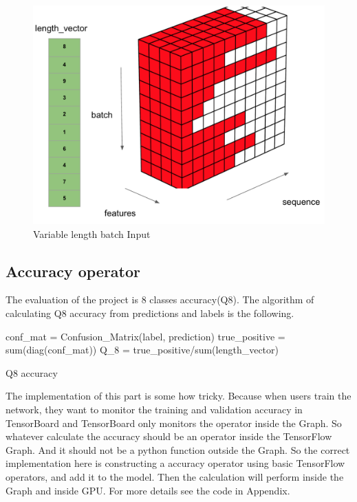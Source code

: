 \begin{figure}[H] 
	\centering
	\includegraphics[width=5in]{Figures/loss}
	\caption[Variable length batch Input]{Variable length batch Input}
	\label{fig:loss}
\end{figure}

\subsection{Accuracy operator}
The evaluation of the project is 8 classes accuracy(Q8). The algorithm of calculating Q8 accuracy from predictions and labels is the following.\newline

\begin{algorithm}[H] 
    conf\_mat = Confusion\_Matrix(label, prediction)\;
    true\_positive = sum(diag(conf\_mat))\;
    Q\_8 = true\_positive/sum(length\_vector)\;
 \caption{Q8 accuracy }
\end{algorithm}
\vspace{0.5cm}
The implementation of this part is some how tricky. Because when users train the network, they want to monitor the training and validation accuracy in TensorBoard and TensorBoard only monitors the operator inside the Graph. So whatever calculate the accuracy should be an operator inside the TensorFlow Graph. And it should not be a python function outside the Graph. So the correct implementation here is constructing a accuracy operator using basic TensorFlow operators, and add it to the model. Then the calculation will perform inside the Graph and inside GPU. For more details see the code in Appendix.\par

